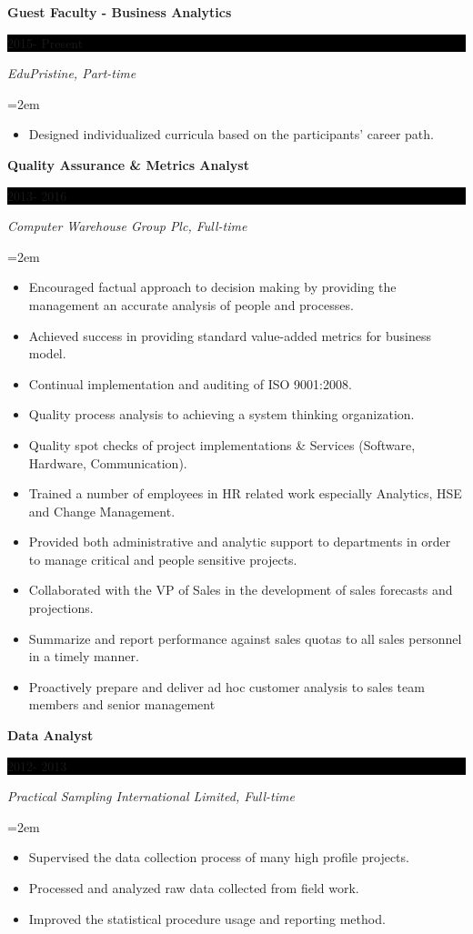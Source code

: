 \documentclass[paper=a4,fontsize=10pt]{scrartcl} %
\newcommand{\sepspace}{\vspace*{1em}}       %
\newcommand{\EducationEntry}[4]{
        \noindent \textbf{#1} \hfill      %
        \colorbox{Black}{%
            \parbox{6em}{%
            \hfill\color{White}#2}} \par  %
        \noindent \textit{#3} \par        %
        \noindent\hangindent=2em\hangafter=0 \small #4 %
        \normalsize \par}
\begin{document}
\EducationEntry{Guest Faculty - Business Analytics}{2015- Present}{EduPristine, Part-time}{
	\begin{itemize}
		\item Designed individualized curricula based on the participants' career path.
	\end{itemize}}
	
\sepspace


\EducationEntry{Quality Assurance \& Metrics Analyst}{2013- 2016}{Computer Warehouse Group Plc, Full-time}{
	\begin{itemize}
	\item	Encouraged factual approach to decision making by providing the management an accurate analysis of people and processes.
		\item 	Achieved success in providing standard value-added metrics for business model.
	\item 	Continual implementation and auditing of ISO 9001:2008.
	\item 	Quality process analysis to achieving a system thinking organization.
		\item Quality spot checks of project implementations \& Services (Software, Hardware, Communication).
	\item 	Trained a number of employees in HR related work especially Analytics, HSE and Change Management.
		\item Provided both administrative and analytic support to departments in order to manage critical and people sensitive projects.
	\item Collaborated with the VP of Sales in the development of sales forecasts and projections. 
	\item Summarize and report performance against sales quotas to all sales personnel in a timely manner. 
\item 	Proactively prepare and deliver ad hoc customer analysis to sales team members and senior management
	\end{itemize}}

\sepspace


\EducationEntry{Data Analyst}{2012- 2013}{Practical Sampling International Limited, Full-time}{
	\begin{itemize}
		\item Supervised the data collection process of many high profile projects.
		\item Processed and analyzed raw data collected from field work.
		\item 	Improved the statistical procedure usage and reporting method.
	\end{itemize}}
\end{document}
